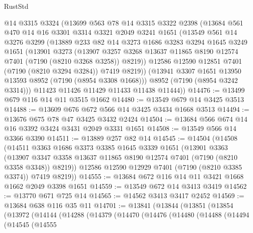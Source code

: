 \begin{lexlean}{RustStd}
\begin{coremodule}
      @14
      @3315
      @3324
      (@13699
        @563
        @78
        @14
        @3315
        @3322
        @2398
        (@13684
          @561
          @470
          @14
          @16
          @3301
          @3314
          @3321
          @2049
          @3241
          @1651
          (@13549
            @561
            @14
            @3276
            @3299
            (@13889
              @233
              @82
              @14
              @3273
              @1686
              @3283
              @3294
              @1645
              @3249
              @1651
              (@13901
                @3273
                (@13907
                  @3257
                  @3268
                  @13637
                  @11865
                  @8190
                  @12574
                  @7401
                  (@7190 (@8210 @3268 @3258))
                  @8219))
              @12586
              @12590
              @12851
              @7401
              (@7190 (@8210 @3294 @3284))
              @7419
              @8219))
          (@13941 @3307 @1651 @13950 @13593 @8952 (@7190 (@8954 @3308 @1668)))
          @8952
          (@7190 (@8954 @3242 @3314)))
        @11423
        @11426
        @11429
        @11433
        @11438
        @11444))
@14476 := @13499 @679 @116 @14 @11 @3515 @1662
@14480 := @13549 @679 @14 @3425 @3513
@14488 := @13609 @676 @672 @566 @14 @3425 @3434 @1668 @3513
@14494 := @13676 @675 @78 @47 @3425 @3432 @2424
@14504 := @13684 @566 @674 @14 @16 @3392 @3424 @3431 @2049 @3331 @1651
@14508 := @13549 @566 @14 @3366 @3390
@14511 := @13889 @257 @82 @14
@14545 := @14504
    (@14508
      (@14511
        @3363
        @1686
        @3373
        @3385
        @1645
        @3339
        @1651
        (@13901
          @3363
          (@13907 @3347 @3358 @13637 @11865 @8190 @12574 @7401 (@7190 (@8210 @3358 @3348)) @8219))
        @12586
        @12590
        @12929
        @7401
        (@7190 (@8210 @3385 @3374))
        @7419
        @8219))
@14555 := @13684 @672 @116 @14 @11 @3421 @1668 @1662 @2049 @3398 @1651
@14559 := @13549 @672 @14 @3413 @3419
@14562 := @13770 @671 @725 @14
@14565 := @14562 @3413 @3417 @2452
@14569 := @13684 @638 @116 @35 @11
@14701 := @13841
    (@13844
      (@13851
        (@13854
          (@13972
            (@14144
              (@14288
                (@14379
                  (@14470
                    (@14476
                      (@14480
                        (@14488
                          (@14494
                            (@14545
                              (@14555

\end{coremodule}
\end{lexlean}
